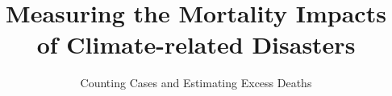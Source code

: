 \usepackage{booktabs}
\usepackage{array}
\usepackage{colortbl}
\usepackage[british]{babel}
\usepackage{graphicx,hyperref,url}
\usepackage{fontawesome}
\usepackage{hyperref}
\usepackage{adjustbox}
\usepackage{appendixnumberbeamer}
\hypersetup{colorlinks=true,allcolors=blue}
\usepackage{xcolor}

\title{Measuring the Mortality Impacts of Climate-related Disasters}
\subtitle{Counting Cases and Estimating Excess Deaths}

